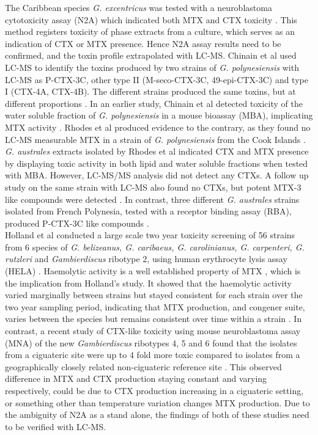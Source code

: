 \documentclass[12pt]{article}
\begin{document}
The Caribbean species \emph{G. excentricus} was tested with a neuroblastoma cytotoxicity assay (N2A) which indicated both MTX and CTX toxicity \cite{fraga2011gambierdiscus}. This method registers toxicity of phase extracts from a culture, which serves as an indication of  CTX or MTX presence. 
Hence N2A assay results need to be confirmed, and the toxin profile extrapolated with LC-MS. 
Chinain et al used LC-MS to identify the toxins produced by two strains of \emph{G. polynesiensis} with LC-MS as P-CTX-3C, other type II (M-seco-CTX-3C, 49-epi-CTX-3C) and type I (CTX-4A, CTX-4B). The different strains produced the same toxins, but at different proportions \cite{chinain2010growth}. In an earlier study, Chinain et al detected toxicity of the water soluble fraction of \emph{G. polynesiensis} in a mouse bioassay (MBA), implicating MTX activity \cite{chinain1999morphology}. Rhodes et al produced evidence to the contrary, as they found no LC-MS measurable MTX in a strain of \emph{G. polynesiensis} from the Cook Islands \cite{rhodes2014production}.
\emph{G. australes} extracts isolated by Rhodes et al indicated CTX and MTX presence by displaying toxic activity in both lipid and water soluble fractions when tested with MBA. However, LC-MS/MS analysis did not detect any CTXs. A follow up study on the same strain with LC-MS also found no CTXs, but potent MTX-3 like compounds were detected \cite{rhodes2014production,rhodes2010toxic}. In contrast, three different \emph{G. australes} strains isolated from French Polynesia, tested with a receptor binding assay (RBA), produced P-CTX-3C like compounds \cite{chinain2010growth}.\\

Holland et al conducted a large scale two year toxicity screening of 56 strains from 6 species of \emph{G. belizeanus, G. caribaeus, G. carolinianus, G. carpenteri, G. rutzleri} and  \emph{Gambierdiscus} ribotype 2, using human erythrocyte lysis assay (HELA) \cite{holland2013differences}. Haemolytic activity is a well established property of MTX \cite{igarashi1999mechanisms}, which is the implication from Holland's study. It showed that the haemolytic activity varied marginally between strains but stayed consistent for each strain over the two year sampling period, indicating that MTX production, and congener suite, varies between the species but remains consistent over time within a strain \cite{holland2013differences}.
In contrast, a recent study of CTX-like toxicity using mouse neuroblastoma assay (MNA) of the new \emph{Gambierdiscus} ribotypes 4, 5 and 6 found that the isolates from a ciguateric site were up to 4\- fold more toxic compared to isolates from a geographically closely related non-ciguateric reference site \cite{xu2014distribution}. This observed difference in MTX and CTX production staying constant and varying respectively, could be due to CTX production increasing in a ciguateric setting, or something other than temperature variation changes MTX production. Due to the ambiguity of N2A as a stand alone, the findings of both of these studies need to be verified with LC-MS. \\
\end{document}
